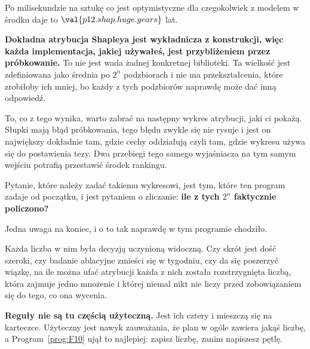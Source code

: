 \begin{fr}
Po milisekundzie na sztukę \dash{} co jest optymistyczne dla czegokolwiek z
modelem w środku \dash{} daje to $\val{p12.shap.huge.years}$ lat.

\begin{trapbox}
\textbf{Dokładna atrybucja Shapleya jest wykładnicza z konstrukcji, więc każda
implementacja, jakiej używałeś, jest przybliżeniem przez próbkowanie.} To nie
jest wada żadnej konkretnej biblioteki. Ta wielkość jest zdefiniowana jako
średnia po $2^{n}$ podzbiorach i nie ma przekształcenia, które zrobiłoby ich
mniej, bo każdy z tych podzbiorów naprawdę może dać inną odpowiedź.

To, co z tego wynika, warto zabrać na następny wykres atrybucji, jaki ci
pokażą. Słupki mają błąd próbkowania, tego błędu zwykle się nie rysuje i jest
on największy dokładnie tam, gdzie cechy oddziałują \dash{} czyli tam, gdzie
wykresu używa się do postawienia tezy. Dwa przebiegi tego samego wyjaśniacza
na tym samym wejściu potrafią przestawić środek rankingu.

Pytanie, które należy zadać takiemu wykresowi, jest tym, które ten program
zadaje od początku, i jest pytaniem o zliczanie: \textbf{ile z tych
$2^{n}$ faktycznie policzono?}
\end{trapbox}
\end{fr}

\begin{fr}
Jedna uwaga na koniec, i o to tak naprawdę w tym programie chodziło.

Każda liczba w nim była decyzją uczynioną widoczną. Czy skrót jest dość
szeroki, czy badanie ablacyjne zmieści się w tygodniu, czy da się poszerzyć
wiązkę, na ile można ufać atrybucji \dash{} każda z nich została
rozstrzygnięta liczbą, która zajmuje jedno mnożenie i której niemal nikt nie
liczy przed zobowiązaniem się do tego, co ona wycenia.

\textbf{Reguły nie są tu częścią użyteczną.} Jest ich cztery i mieszczą się na
karteczce. Użyteczny jest nawyk zauważania, że plan w ogóle zawiera jakąś
liczbę, a Program~\ref{prog:F10} ujął to najlepiej: zapisz liczbę, zanim
napiszesz pętlę.
\end{fr}

